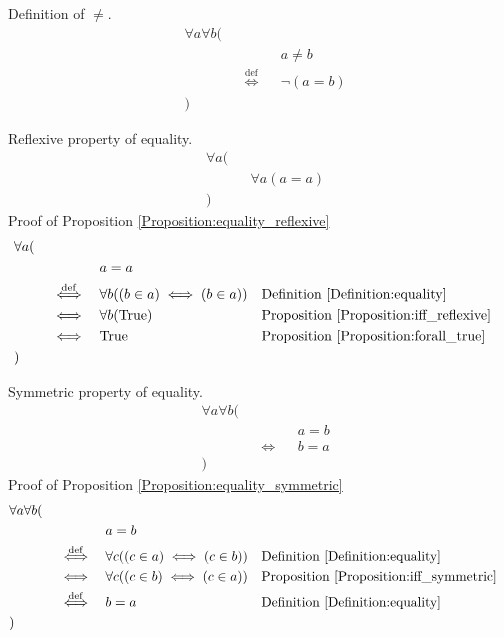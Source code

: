 \begin{defn}
\label{Definition:neq}
Definition of $\neq$.
\begin{align*}
& \forall a \forall b ( \\
& \quad && && a \neq b \\
& \quad && \overset{\operatorname{def}}{\iff} && \lnot (a = b) \\
& )
\end{align*}
\end{defn}

\begin{prop}
\label{Proposition:equality_reflexive}
Reflexive property of equality.
\begin{align*}
& \forall a ( \\
& \quad && \forall a (a = a) \\
& )
\end{align*}
Proof of Proposition \ref{Proposition:equality_reflexive}
\begin{align*}
& \forall a ( \\
& \quad && && a = a \\
& \quad && \overset{\operatorname{def}}{\iff} && \forall b ((b \in a) \iff (b \in a))
&& \text{Definition \ref{Definition:equality}} \\
& \quad && \iff && \forall b (\text{True})
&& \text{Proposition \ref{Proposition:iff_reflexive}} \\
& \quad && \iff && \text{True}
&& \text{Proposition \ref{Proposition:forall_true}} \\
& )
\end{align*}
\end{prop}

\begin{prop}
\label{Proposition:equality_symmetric}
Symmetric property of equality.
\begin{align*}
& \forall a \forall b ( \\
& \quad && && a = b \\
& \quad && \iff && b = a \\
& )
\end{align*}
Proof of Proposition \ref{Proposition:equality_symmetric}
\begin{align*}
& \forall a \forall b ( \\
& \quad && && a = b \\
& \quad && \overset{\operatorname{def}}{\iff} && \forall c ((c \in a) \iff (c \in b))
&& \text{Definition \ref{Definition:equality}} \\
& \quad && \iff && \forall c ((c \in b) \iff (c \in a))
&& \text{Proposition \ref{Proposition:iff_symmetric}} \\
& \quad && \overset{\operatorname{def}}{\iff} && b = a
&& \text{Definition \ref{Definition:equality}} \\
& )
\end{align*}
\end{prop}

